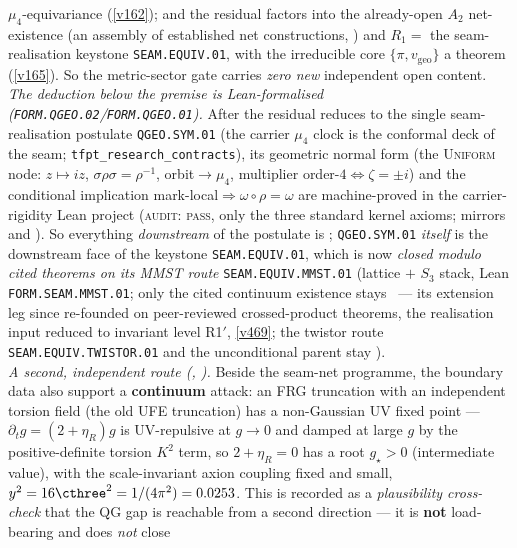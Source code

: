 $\mu_4$-equivariance (\vref{v162}); and the residual factors into the already-open $A_2$ net-existence (an
assembly of established net constructions, \mC) and $R_1=$ the seam-realisation keystone \texttt{SEAM.EQUIV.01}, with the irreducible core
$\{\pi,v_{\mathrm{geo}}\}$ a theorem (\vref{v165}). So the metric-sector gate carries \emph{zero new}
independent open content. 
\smallskip\\
\noindent\emph{The deduction below the premise is Lean-formalised (\texttt{FORM.QGEO.02}/\texttt{FORM.QGEO.01}).}
After the residual reduces to the single seam-realisation postulate \texttt{QGEO.SYM.01} (the carrier
$\mu_4$ clock is the conformal deck of the seam; \texttt{tfpt\_research\_contracts}), its geometric normal
form (the \textsc{Uniform} node: $z\mapsto iz$, $\sigma\rho\sigma=\rho^{-1}$, orbit$\to\mu_4$, multiplier
order-$4\Leftrightarrow\zeta{=}\pm i$) and the conditional implication mark-local$\Rightarrow\omega\circ
\rho=\omega$ are machine-proved in the carrier-rigidity Lean project (\textsc{audit: pass}, only the three
standard kernel axioms; mirrors  and ).
So everything \emph{downstream} of the postulate is \mE; \texttt{QGEO.SYM.01} \emph{itself} is the downstream
face of the keystone \texttt{SEAM.EQUIV.01}, which is now \emph{closed modulo cited theorems on its MMST route}
\texttt{SEAM.EQUIV.MMST.01} (lattice $+$ $S_3$
stack, Lean \texttt{FORM.SEAM.MMST.01}; only the cited continuum existence stays \mO\ --- its extension leg since
re-founded on peer-reviewed crossed-product theorems, the realisation input reduced to invariant level R1$'$,
\vref{v469}; the twistor route \texttt{SEAM.EQUIV.TWISTOR.01} and the unconditional parent stay \mO).
\smallskip\\
\noindent\emph{A second, independent route (, \mO).} Beside the seam-net
programme, the boundary data also support a \textbf{continuum} attack: an FRG truncation with an independent
torsion field (the old UFE truncation) has a non-Gaussian UV fixed point --- $\partial_t g=(2+\eta_R)g$ is
UV-repulsive at $g\!\to\!0$ and damped at large $g$ by the positive-definite torsion $K^2$ term, so
$2+\eta_R=0$ has a root $g_\star>0$ (intermediate value), with the scale-invariant axion coupling fixed and
small, $y^2=16\cthree^2=1/(4\pi^2)=0.0253$. This is recorded as a \emph{plausibility cross-check} that the
QG gap is reachable from a second direction --- it is \textbf{not} load-bearing and does \emph{not} close
